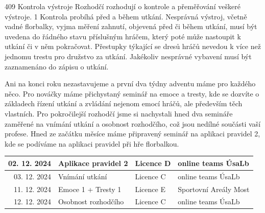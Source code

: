 \documentclass{newsletter}
\begin{document}
\clearpage
{}

\begin{pravidlo}
	{409 Kontrola výstroje}
	{Rozhodčí rozhodují o kontrole a přeměřování veškeré výstroje.}
	{1} Kontrola probíhá před a během utkání. Nesprávná výstroj, včetně vadné florbalky, vyjma měření zahnutí, objevená
	před či během utkání, musí být uvedena do řádného stavu příslušným hráčem, který poté může nastoupit k utkání
	či v něm pokračovat. Přestupky týkající se dresů hráčů nevedou k více než jednomu trestu pro družstvo za utkání. Jakékoliv nesprávné vybavení musí být zaznamenáno do zápisu o utkání.
\end{pravidlo}

Ani na konci roku nezastavujeme a první dva týdny adventu máme pro každého něco. Pro nováčky máme přichystaný seminář na emoce a tresty, kde se dozvíte o základech řízení utkání a zvládání nejenom emocí hráčů, ale především těch vlastních. Pro pokročilejší rozhodčí jsme si nachystali hned dva semináře zaměřené na vnímání utkání a osobnost rozhodčího, což jsou nedílné součásti vaší profese. Hned ze začátku měsíce máme připravený seminář na aplikaci pravidel 2, kde se podíváme na aplikaci pravidel při hře florbalkou.

\begin{table}[h]
	\centering
	\renewcommand{\arraystretch}{2}
	\begin{tabular}{| r | l | l | l |}
		\hline
		02. 12. 2024 & Aplikace pravidel 2 & Licence D & online teams ÚsaLb \\
		\hline
		03. 12. 2024 & Vnímání utkání & Licence C & online teams ÚsaLb \\
		\hline
		11. 12. 2024 & Emoce 1 + Tresty 1 & Licence E & Sportovní Areály Most \\
		\hline
		12. 12. 2024 & Osobnost rozhodčího & Licence C & online teams ÚsaLb \\
		\hline
	\end{tabular}
\end{table}
\end{document}
